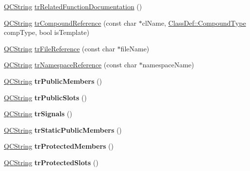 \begin{DoxyCompactItemize}
\mbox{\hyperlink{class_q_c_string}{Q\+C\+String}} \mbox{\hyperlink{class_translator_polish_a7fa3c196cf1611345ada1a3f7a2f523f}{tr\+Related\+Function\+Documentation}} ()
\item 
\mbox{\hyperlink{class_q_c_string}{Q\+C\+String}} \mbox{\hyperlink{class_translator_polish_aa197df64fa1533b150f893d023981675}{tr\+Compound\+Reference}} (const char $\ast$cl\+Name, \mbox{\hyperlink{class_class_def_ae70cf86d35fe954a94c566fbcfc87939}{Class\+Def\+::\+Compound\+Type}} comp\+Type, bool is\+Template)
\item 
\mbox{\hyperlink{class_q_c_string}{Q\+C\+String}} \mbox{\hyperlink{class_translator_polish_a48b145d50b8529cb0164837701064360}{tr\+File\+Reference}} (const char $\ast$file\+Name)
\item 
\mbox{\hyperlink{class_q_c_string}{Q\+C\+String}} \mbox{\hyperlink{class_translator_polish_ad6178061269bdf4a4f9c948e1e5c560c}{tr\+Namespace\+Reference}} (const char $\ast$namespace\+Name)
\item 
\mbox{\label{class_translator_polish_ab35e2af702b80c97e7642f02a2e89671}} 
\mbox{\hyperlink{class_q_c_string}{Q\+C\+String}} {\bfseries tr\+Public\+Members} ()
\item 
\mbox{\label{class_translator_polish_a945e916d206e501950a2acbe640ba1e0}} 
\mbox{\hyperlink{class_q_c_string}{Q\+C\+String}} {\bfseries tr\+Public\+Slots} ()
\item 
\mbox{\label{class_translator_polish_ad79acd5ee61ccb49050dc22354cc4318}} 
\mbox{\hyperlink{class_q_c_string}{Q\+C\+String}} {\bfseries tr\+Signals} ()
\item 
\mbox{\label{class_translator_polish_af5136569f8661f44d9ca8beffcaead62}} 
\mbox{\hyperlink{class_q_c_string}{Q\+C\+String}} {\bfseries tr\+Static\+Public\+Members} ()
\item 
\mbox{\label{class_translator_polish_a47e84feab31cd247e73920da5100be99}} 
\mbox{\hyperlink{class_q_c_string}{Q\+C\+String}} {\bfseries tr\+Protected\+Members} ()
\item 
\mbox{\label{class_translator_polish_ae392ac7cba7e92e3b5035b2579e43563}} 
\mbox{\hyperlink{class_q_c_string}{Q\+C\+String}} {\bfseries tr\+Protected\+Slots} ()

\end{DoxyCompactItemize}
